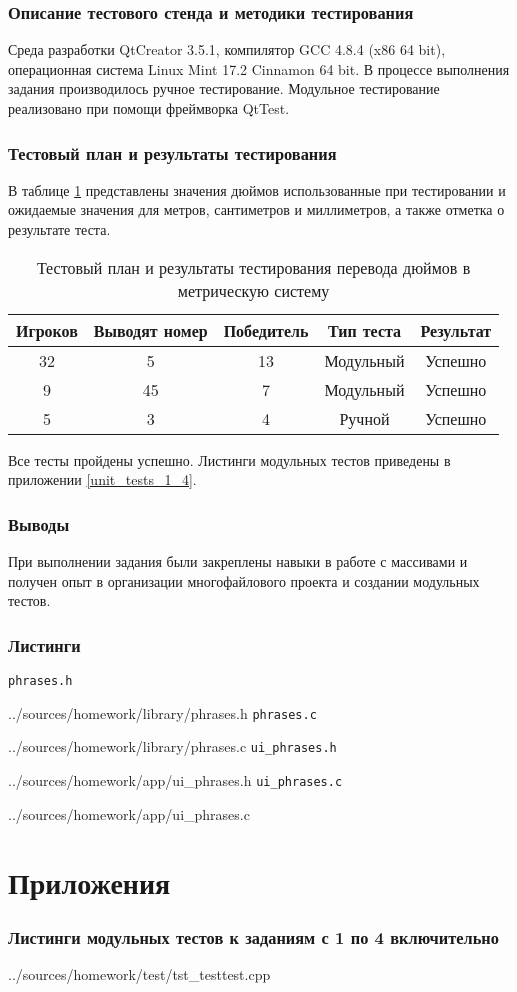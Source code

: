 \documentclass[12pt,a4paper]{report}
\begin{document}
\subsection{Описание тестового стенда и методики тестирования}
\hspace{\parindent}Среда разработки QtCreator 3.5.1, компилятор GCC 4.8.4 (x86 64 bit), операционная система Linux Mint 17.2 Cinnamon 64 bit.
В процессе выполнения задания производилось ручное тестирование.
Модульное тестирование реализовано при помощи фреймворка QtTest.

\subsection{Тестовый план и результаты тестирования}
\hspace{\parindent}В таблице \ref{inch_to_cm_test_plan} представлены значения дюймов использованные при тестировании и ожидаемые значения для метров, сантиметров и миллиметров, а также отметка о результате теста.
\FloatBarrier
\begin{table}[h]
\caption{Тестовый план и результаты тестирования перевода дюймов в метрическую систему}
\label{inch_to_cm_test_plan}
\begin{tabular}{| c c | c | c | c |}
\hline 
Игроков & Выводят номер & Победитель & Тип теста & Результат\\ 
\hline 
32 & 5 & 13 & Модульный & Успешно \\ 
\hline 
9 & 45 & 7 & Модульный & Успешно \\ 
\hline 
5 & 3 & 4 & Ручной & Успешно \\ 
\hline 
\end{tabular} 
\end{table}
\FloatBarrier
Все тесты пройдены успешно. Листинги модульных тестов приведены в приложении \ref{unit_tests_1_4}.
\subsection{Выводы}
\hspace{\parindent}При выполнении задания были закреплены навыки в работе с массивами и получен опыт в организации многофайлового проекта и создании модульных тестов.

\newpage
\subsection{Листинги}
\verb+phrases.h+

{../sources/homework/library/phrases.h}
\verb+phrases.c+

{../sources/homework/library/phrases.c}
\verb+ui_phrases.h+

{../sources/homework/app/ui_phrases.h}
\verb+ui_phrases.c+

{../sources/homework/app/ui_phrases.c}




\chapter*{Приложения}
\subsection*{Листинги модульных тестов к заданиям с 1 по 4 включительно}

{../sources/homework/test/tst_testtest.cpp}
\end{document}
